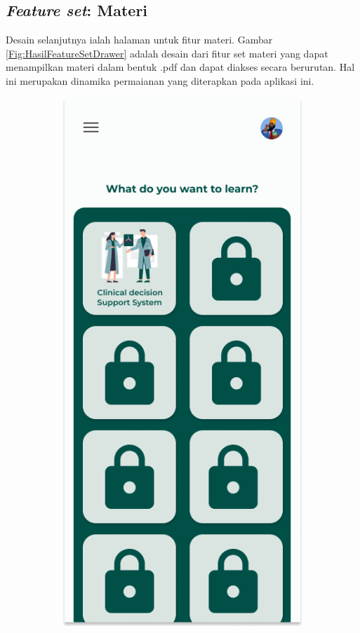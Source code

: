 \subsection{\textit{Feature set}: Materi}
Desain selanjutnya ialah halaman untuk fitur materi. Gambar \ref*{Fig:HasilFeatureSetDrawer} adalah desain dari fitur set materi yang
dapat menampilkan materi dalam bentuk .pdf dan dapat diakses secara berurutan.
Hal ini merupakan dinamika permaianan yang diterapkan pada aplikasi ini.
\begin{figure}[H]
	\centering
	\begin{subfigure}[b]{0.23\textwidth}
		\centering
	  \includegraphics[width=\linewidth]{contents/chapter-3/images/HF-materi.png}

\end{subfigure}
\end{figure}
